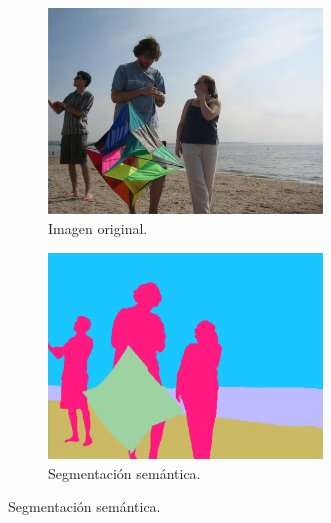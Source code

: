 \begin{figure}[htbp]
    \centering
    \begin{subfigure}[b]{0.45\textwidth}
        \centering
        \includegraphics[width=0.8\textwidth]{figures/image.png}
        \caption{Imagen original.}
        \label{fig:segmentation_types_original}
    \end{subfigure}
    \begin{subfigure}[b]{0.45\textwidth}
        \centering
        \includegraphics[width=0.8\textwidth]{figures/semantic_segmentation.png}
        \caption{Segmentación semántica.}
        \label{fig:segmentation_types_semantic}
    \end{subfigure}
    \vspace{0.5cm}


\end{figure}
